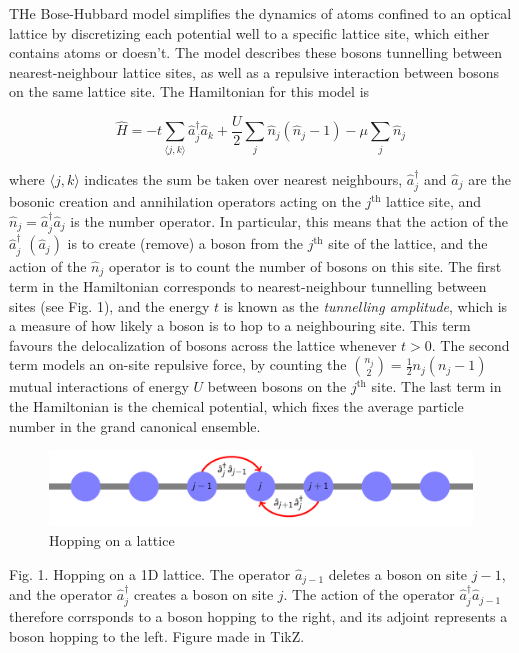 \documentclass[11pt]{article}
\makeatletter
\def\maxwidth{\ifdim\Gin@nat@width>\linewidth\linewidth
    \else\Gin@nat@width\fi}
\let\Oldincludegraphics\includegraphics
\renewcommand{\includegraphics}[1]{\Oldincludegraphics[width=.8\maxwidth]{#1}}
\makeatother
\begin{document}
THe Bose-Hubbard model simplifies the dynamics of atoms confined to an
optical lattice by discretizing each potential well to a specific
lattice site, which either contains atoms or doesn't. The model
describes these bosons tunnelling between nearest-neighbour lattice
sites, as well as a repulsive interaction between bosons on the same
lattice site. The Hamiltonian for this model is

\begin{equation}  
\hat H = -t \sum_{\langle j,k \rangle} \hat a_{j}^\dagger \hat a_{k} + \frac U2 \sum_{j} \hat n_{j} \left( \hat n_{j} -1 \right) -\mu \sum_{j} \hat n_{j}
\end{equation}

where \(\langle j,k \rangle\) indicates the sum be taken over nearest
neighbours, \(\hat a_j^\dagger\) and \(\hat a_j\) are the bosonic
creation and annihilation operators acting on the \(j^\text{th}\)
lattice site, and \(\hat n_j = \hat a_j^\dagger \hat a_j\) is the number
operator. In particular, this means that the action of the
\(\hat a_j^\dagger\) \(\left( \hat a_j \right)\) is to create (remove) a
boson from the \(j^\text{th}\) site of the lattice, and the action of
the \(\hat n_j\) operator is to count the number of bosons on this site.
The first term in the Hamiltonian corresponds to nearest-neighbour
tunnelling between sites (see Fig. 1), and the energy \(t\) is known as
the \textit{tunnelling amplitude}, which is a measure of how likely a
boson is to hop to a neighbouring site. This term favours the
delocalization of bosons across the lattice whenever \(t >0\). The
second term models an on-site repulsive force, by counting the
\(\binom{n_j}{2} = \frac 12 n_j(n_j-1)\) mutual interactions of energy
\(U\) between bosons on the \(j^\text{th}\) site. The last term in the
Hamiltonian is the chemical potential, which fixes the average particle
number in the grand canonical ensemble.

\begin{figure}
\centering
\includegraphics{lattice.png}
\caption{Hopping on a lattice}
\end{figure}

Fig. 1. Hopping on a 1D lattice. The operator \(\hat a_{j-1}\) deletes a
boson on site \(j-1\), and the operator \(\hat a_j^\dagger\) creates a
boson on site \(j\). The action of the operator
\(\hat a_j^\dagger \hat a_{j-1}\) therefore corrsponds to a boson
hopping to the right, and its adjoint represents a boson hopping to the
left. Figure made in TikZ.
\end{document}
